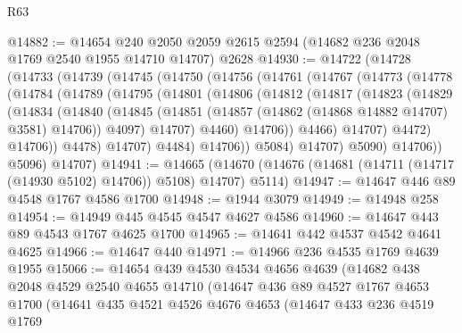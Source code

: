 \begin{lexlean}{R63}
\begin{coremodule}
@14882 := @14654
    @240
    @2050
    @2059
    @2615
    @2594
    (@14682 @236 @2048 @1769 @2540 @1955 @14710 @14707)
    @2628
@14930 := @14722
    (@14728
      (@14733
        (@14739
          (@14745
            (@14750
              (@14756
                (@14761
                  (@14767
                    (@14773
                      (@14778
                        (@14784
                          (@14789
                            (@14795
                              (@14801
                                (@14806
                                  (@14812
                                    (@14817
                                      (@14823
                                        (@14829
                                          (@14834
                                            (@14840
                                              (@14845
                                                (@14851
                                                  (@14857
                                                    (@14862 (@14868 @14882 @14707) @3581)
                                                    @14706))
                                                @4097)
                                              @14707)
                                            @4460)
                                          @14706))
                                      @4466)
                                    @14707)
                                  @4472)
                                @14706))
                            @4478)
                          @14707)
                        @4484)
                      @14706))
                  @5084)
                @14707)
              @5090)
            @14706))
        @5096)
      @14707)
@14941 := @14665
    (@14670 (@14676 (@14681 (@14711 (@14717 (@14930 @5102) @14706)) @5108) @14707) @5114)
@14947 := @14647 @446 @89 @4548 @1767 @4586 @1700
@14948 := @1944 @3079
@14949 := @14948 @258
@14954 := @14949 @445 @4545 @4547 @4627 @4586
@14960 := @14647 @443 @89 @4543 @1767 @4625 @1700
@14965 := @14641 @442 @4537 @4542 @4641 @4625
@14966 := @14647 @440
@14971 := @14966 @236 @4535 @1769 @4639 @1955
@15066 := @14654
    @439
    @4530
    @4534
    @4656
    @4639
    (@14682
      @438
      @2048
      @4529
      @2540
      @4655
      @14710
      (@14647
        @436
        @89
        @4527
        @1767
        @4653
        @1700
        (@14641
          @435
          @4521
          @4526
          @4676
          @4653
          (@14647
            @433
            @236
            @4519
            @1769

\end{coremodule}
\end{lexlean}

